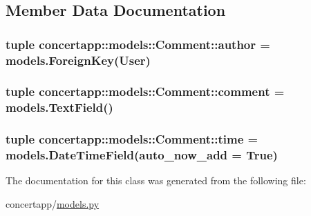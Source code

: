 \subsection{Member Data Documentation}
\hypertarget{classconcertapp_1_1models_1_1_comment_afc36ce4a9b73587bd72aa72bc18f44f4}{
\subsubsection[{author}]{\setlength{\rightskip}{0pt plus 5cm}tuple {\bf concertapp::models::Comment::author} = models.ForeignKey(User)}}
\label{classconcertapp_1_1models_1_1_comment_afc36ce4a9b73587bd72aa72bc18f44f4}
\hypertarget{classconcertapp_1_1models_1_1_comment_a287164c501a40ad530ef8b28e4a220f2}{
\subsubsection[{comment}]{\setlength{\rightskip}{0pt plus 5cm}tuple {\bf concertapp::models::Comment::comment} = models.TextField()}}
\label{classconcertapp_1_1models_1_1_comment_a287164c501a40ad530ef8b28e4a220f2}
\hypertarget{classconcertapp_1_1models_1_1_comment_aa11fc611392b8d8d932fcdee75feb0a2}{
\subsubsection[{real\_\-type}]{}}
\label{classconcertapp_1_1models_1_1_comment_aa11fc611392b8d8d932fcdee75feb0a2}
\hypertarget{classconcertapp_1_1models_1_1_comment_ac9f8e60e36d0d17628ab385d61e66bff}{
\subsubsection[{time}]{\setlength{\rightskip}{0pt plus 5cm}tuple {\bf concertapp::models::Comment::time} = models.DateTimeField(auto\_\-now\_\-add = True)}}
\label{classconcertapp_1_1models_1_1_comment_ac9f8e60e36d0d17628ab385d61e66bff}


The documentation for this class was generated from the following file:\begin{DoxyCompactItemize}
\item 
concertapp/\hyperlink{models_8py}{models.py}\end{DoxyCompactItemize}
